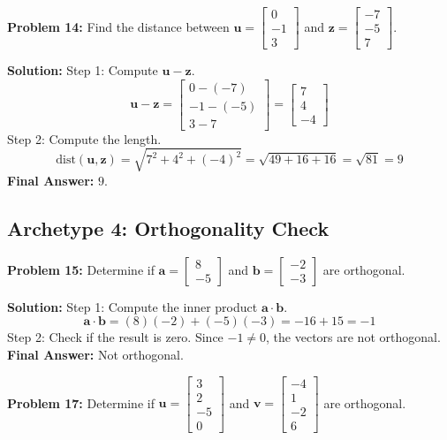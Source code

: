 \documentclass[11pt, letterpaper]{article}
\theoremstyle{definition}
\theoremstyle{remark}
\begin{document}
\vspace{1em}
\textbf{Problem 14:} Find the distance between $\mathbf{u} = \begin{bmatrix} 0 \\ -1 \\ 3 \end{bmatrix}$ and $\mathbf{z} = \begin{bmatrix} -7 \\ -5 \\ 7 \end{bmatrix}$.

\textbf{Solution:}
Step 1: Compute $\mathbf{u} - \mathbf{z}$.
\[ \mathbf{u} - \mathbf{z} = \begin{bmatrix} 0 - (-7) \\ -1 - (-5) \\ 3 - 7 \end{bmatrix} = \begin{bmatrix} 7 \\ 4 \\ -4 \end{bmatrix} \]
Step 2: Compute the length.
\[ \text{dist}(\mathbf{u}, \mathbf{z}) = \sqrt{7^2 + 4^2 + (-4)^2} = \sqrt{49 + 16 + 16} = \sqrt{81} = 9 \]
\textbf{Final Answer:} $9$.

\subsection{Archetype 4: Orthogonality Check}

\textbf{Problem 15:} Determine if $\mathbf{a} = \begin{bmatrix} 8 \\ -5 \end{bmatrix}$ and $\mathbf{b} = \begin{bmatrix} -2 \\ -3 \end{bmatrix}$ are orthogonal.

\textbf{Solution:}
Step 1: Compute the inner product $\mathbf{a} \cdot \mathbf{b}$.
\[ \mathbf{a} \cdot \mathbf{b} = (8)(-2) + (-5)(-3) = -16 + 15 = -1 \]
Step 2: Check if the result is zero. Since $-1 \neq 0$, the vectors are not orthogonal.
\textbf{Final Answer:} Not orthogonal.

\vspace{1em}
\textbf{Problem 17:} Determine if $\mathbf{u} = \begin{bmatrix} 3 \\ 2 \\ -5 \\ 0 \end{bmatrix}$ and $\mathbf{v} = \begin{bmatrix} -4 \\ 1 \\ -2 \\ 6 \end{bmatrix}$ are orthogonal.
\end{document}
